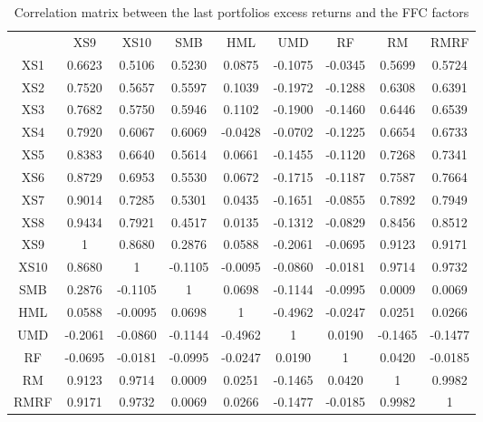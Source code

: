\documentclass[11pt]{article}
\begin{document}
\begin{table}[H]
    \centering
    \small
    \begin{tabular}{ccccccccc}
    \toprule
    \toprule
        & XS9 & XS10 & SMB & HML & UMD & RF & RM & RMRF \\ 
        XS1 & 0.6623 & 0.5106 & 0.5230 & 0.0875 & -0.1075 & -0.0345 & 0.5699 & 0.5724 \\ 
        XS2 & 0.7520 & 0.5657 & 0.5597 & 0.1039 & -0.1972 & -0.1288 & 0.6308 & 0.6391 \\ 
        XS3 & 0.7682 & 0.5750 & 0.5946 & 0.1102 & -0.1900 & -0.1460 & 0.6446 & 0.6539 \\ 
        XS4 & 0.7920 & 0.6067 & 0.6069 & -0.0428 & -0.0702 & -0.1225 & 0.6654 & 0.6733 \\ 
        XS5 & 0.8383 & 0.6640 & 0.5614 & 0.0661 & -0.1455 & -0.1120 & 0.7268 & 0.7341 \\ 
        XS6 & 0.8729 & 0.6953 & 0.5530 & 0.0672 & -0.1715 & -0.1187 & 0.7587 & 0.7664 \\ 
        XS7 & 0.9014 & 0.7285 & 0.5301 & 0.0435 & -0.1651 & -0.0855 & 0.7892 & 0.7949 \\ 
        XS8 & 0.9434 & 0.7921 & 0.4517 & 0.0135 & -0.1312 & -0.0829 & 0.8456 & 0.8512 \\ 
        XS9 & 1 & 0.8680 & 0.2876 & 0.0588 & -0.2061 & -0.0695 & 0.9123 & 0.9171 \\ 
        XS10 & 0.8680 & 1 & -0.1105 & -0.0095 & -0.0860 & -0.0181 & 0.9714 & 0.9732 \\ 
        SMB & 0.2876 & -0.1105 & 1 & 0.0698 & -0.1144 & -0.0995 & 0.0009 & 0.0069 \\ 
        HML & 0.0588 & -0.0095 & 0.0698 & 1 & -0.4962 & -0.0247 & 0.0251 & 0.0266 \\ 
        UMD & -0.2061 & -0.0860 & -0.1144 & -0.4962 & 1 & 0.0190 & -0.1465 & -0.1477 \\ 
        RF & -0.0695 & -0.0181 & -0.0995 & -0.0247 & 0.0190 & 1 & 0.0420 & -0.0185 \\ 
        RM & 0.9123 & 0.9714 & 0.0009 & 0.0251 & -0.1465 & 0.0420 & 1 & 0.9982 \\ 
        RMRF & 0.9171 & 0.9732 & 0.0069 & 0.0266 & -0.1477 & -0.0185 & 0.9982 & 1 \\ 
        \bottomrule
        \bottomrule
    \end{tabular}
    \caption{Correlation matrix between the last portfolios excess returns and the FFC factors}
    \label{tab:corr_matrix_tot_fin}
\end{table}
\end{document}
